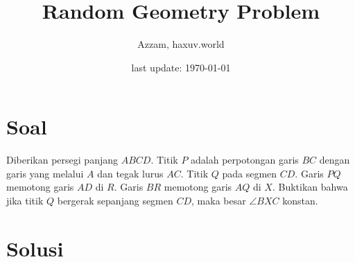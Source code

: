 \documentclass[12pt]{scrartcl}
\title{Random Geometry Problem}
\author{Azzam, haxuv.world}
\date{last update: \today}
\begin{document}
\maketitle
\pagestyle{plain}
\section{Soal}
Diberikan persegi panjang $ABCD$. Titik $P$ adalah perpotongan garis $BC$ dengan garis yang melalui $A$ dan tegak lurus $AC$. Titik $Q$ pada segmen $CD$. Garis $PQ$ memotong garis $AD$ di $R$. Garis $BR$ memotong garis $AQ$ di $X$. Buktikan bahwa jika titik $Q$ bergerak sepanjang segmen $CD$, maka besar $\angle BXC$ konstan.

\newpage
\section{Solusi}
\end{document}

